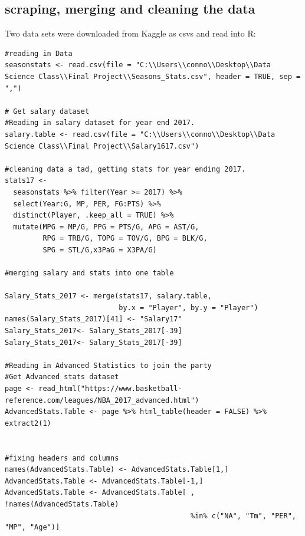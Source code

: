 \documentclass[12pt,english]{article}
\begin{document}
\subsection{scraping, merging and cleaning the data}
Two data sets were downloaded from Kaggle as csvs and read into R:
\begin{singlespace}
\begin{lstlisting}
#reading in Data
seasonstats <- read.csv(file = "C:\\Users\\conno\\Desktop\\Data Science Class\\Final Project\\Seasons_Stats.csv", header = TRUE, sep = ",")

# Get salary dataset 
#Reading in salary dataset for year end 2017.
salary.table <- read.csv(file = "C:\\Users\\conno\\Desktop\\Data Science Class\\Final Project\\Salary1617.csv")

#cleaning data a tad, getting stats for year ending 2017.
stats17 <- 
  seasonstats %>% filter(Year >= 2017) %>% 
  select(Year:G, MP, PER, FG:PTS) %>% 
  distinct(Player, .keep_all = TRUE) %>% 
  mutate(MPG = MP/G, PPG = PTS/G, APG = AST/G, 
         RPG = TRB/G, TOPG = TOV/G, BPG = BLK/G, 
         SPG = STL/G,x3PaG = X3PA/G) 

#merging salary and stats into one table

Salary_Stats_2017 <- merge(stats17, salary.table,
                           by.x = "Player", by.y = "Player")
names(Salary_Stats_2017)[41] <- "Salary17"
Salary_Stats_2017<- Salary_Stats_2017[-39]
Salary_Stats_2017<- Salary_Stats_2017[-39]

#Reading in Advanced Statistics to join the party
#Get Advanced stats dataset
page <- read_html("https://www.basketball-reference.com/leagues/NBA_2017_advanced.html")
AdvancedStats.Table <- page %>% html_table(header = FALSE) %>% extract2(1)


#fixing headers and columns
names(AdvancedStats.Table) <- AdvancedStats.Table[1,]
AdvancedStats.Table <- AdvancedStats.Table[-1,]
AdvancedStats.Table <- AdvancedStats.Table[ , !names(AdvancedStats.Table) 
                                            %in% c("NA", "Tm", "PER", "MP", "Age")]


\end{lstlisting}
\end{singlespace}
\end{document}
